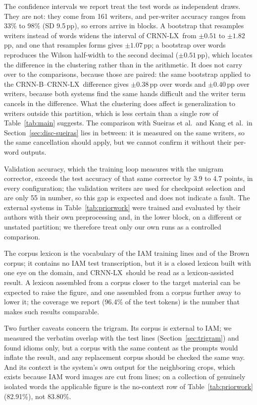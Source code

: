 \documentclass{ws-ijprai}
\newcommand{\ours}{CRNN-LX}            %
\newcommand{\ourwa}{83.80\%}
\newcommand{\uniwa}{82.91\%}           %
\begin{document}
\label{sec:threats-note}The confidence intervals we report treat the test
words as independent draws. They are not: they come from 161 writers, and
per-writer accuracy ranges from 33\% to 98\% (SD 9.5\,pp), so errors arrive
in blocks. A bootstrap that resamples writers instead of words widens the
interval of \ours\ from $\pm0.51$ to $\pm1.82$\,pp, and one that resamples
forms gives $\pm1.07$\,pp; a bootstrap over words reproduces the Wilson
half-width to the second decimal ($\pm0.51$\,pp), which locates the
difference in the clustering rather than in the arithmetic. It does not carry over to the comparisons, because those
are paired: the same bootstrap applied to the CRNN-B--\ours\ difference gives
$\pm0.38$\,pp over words and $\pm0.40$\,pp over writers, because both systems
find the same hands difficult and the writer term cancels in the difference.
What the clustering does affect is generalization to writers outside this
partition, which is less certain than a single row of
Table~\ref{tab:main} suggests. The comparison with Sueiras et al.\ and Kang
et al.\ in Section~\ref{sec:disc-sueiras} lies in between: it is measured on
the same writers, so the same cancellation should apply, but we cannot
confirm it without their per-word outputs.

Validation accuracy, which the training loop measures with the unigram
corrector, exceeds the test accuracy of that same corrector by 3.9 to
4.7 points, in every configuration; the validation writers are used
for checkpoint selection and are only 55 in number, so this gap is
expected and does not indicate a fault. The external systems in Table~\ref{tab:priorwork}
were trained and evaluated by their authors with their own
preprocessing and, in the lower block, on a different or unstated partition; we
therefore treat only our own runs as a controlled comparison.

The corpus
lexicon is the vocabulary of the IAM training lines and of the Brown corpus;
it contains no IAM test transcription, but it is a closed lexicon built with
one eye on the domain, and \ours\ should be read as a lexicon-assisted
result. A lexicon assembled from a corpus closer to the target material
can be expected to raise the figure, and one assembled from a corpus further
away to lower it; the coverage we report (96.4\% of the test tokens) is the
number that makes such results comparable.

Two further caveats concern the trigram. Its corpus is external to
IAM; we measured the verbatim overlap with the test lines
(Section~\ref{sec:trigram}) and found idioms only, but a corpus with
the same content as the prompts would inflate the result, and any
replacement corpus should be checked the same way. And its context is
the system's own output for the neighboring crops, which exists
because IAM word images are cut from lines; on a collection of
genuinely isolated words the applicable figure is the no-context row
of Table~\ref{tab:priorwork} (\uniwa), not \ourwa.
\end{document}
